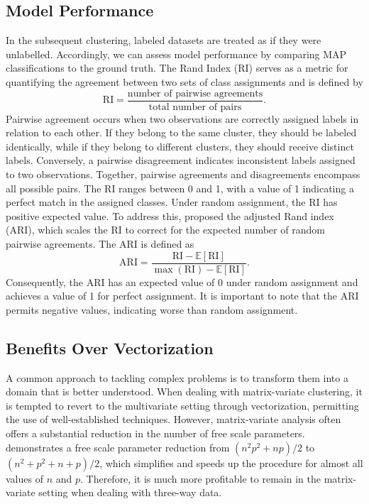 \documentclass[12pt]{report}
\begin{document}
\subsection{Model Performance}
In the subsequent clustering, labeled datasets are treated as if they were unlabelled. Accordingly, we can assess model performance by comparing MAP classifications to the ground truth. The Rand Index (RI) \citep{rand1971} serves as a metric for quantifying the agreement between two sets of class assignments and is defined by
\begin{equation*}
\text{RI} = \frac{\text{number of pairwise agreements}}{\text{total number of pairs}}.
\end{equation*} 
Pairwise agreement occurs when two observations are correctly assigned labels in relation to each other. If they belong to the same cluster, they should be labeled identically, while if they belong to different clusters, they should receive distinct labels. Conversely, a pairwise disagreement indicates inconsistent labels assigned to two observations. Together, pairwise agreements and disagreements encompass all possible pairs. The RI ranges between 0 and 1, with a value of 1 indicating a perfect match in the assigned classes. Under random assignment, the RI has positive expected value. To address this, \citet{hubert1985} proposed the adjusted Rand index (ARI), which scales the RI to correct for the expected number of random pairwise agreements. The ARI is defined as 
\begin{equation*}
\text{ARI} = \frac{\text{RI}  - \mathbb{E}[\text{RI} ]}{\max(\text{RI}) - \mathbb{E}[\text{RI} ]}.
\end{equation*} 
Consequently, the ARI has an expected value of 0 under random assignment and achieves a value of 1 for perfect assignment. It is important to note that the ARI permits negative values, indicating worse than random assignment.




\subsection{Benefits Over Vectorization}
A common approach to tackling complex problems is to transform them into a domain that is better understood. When dealing with matrix-variate clustering, it is tempted to revert to the multivariate setting through vectorization, permitting the use of well-established techniques. However, matrix-variate analysis often offers a substantial reduction in the number of free scale parameters. \citet{gallaugher2018} demonstrates a free scale parameter reduction from $(n^2p^2 + np)/2$ to $(n^2 + p^2 + n + p)/2$, which simplifies and speeds up the procedure for almost all values of $n$ and $p$. Therefore, it is much more profitable to remain in the matrix-variate setting when dealing with three-way data. 
\end{document}
